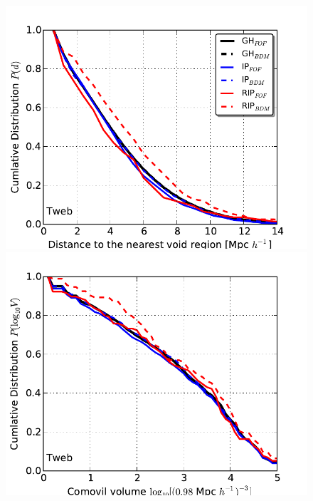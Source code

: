 \documentclass[a4,useAMS,usenatbib,usegraphicx]{latex/mn2e}
\begin{document}
\begin{flushleft}
\begin{figure}
\begin{center}

  \includegraphics[trim = 0mm 0mm 0mm 0mm, clip, keepaspectratio=true,
  width=0.3\textheight]{./figures/voids_distances_samples_Tweb}
  \includegraphics[trim = 0mm 0mm 0mm 0mm, clip, keepaspectratio=true,
  width=0.3\textheight]{./figures/voids_sizes_samples_Tweb}
  

\end{center}
\end{figure}
\end{flushleft}
\end{document}

